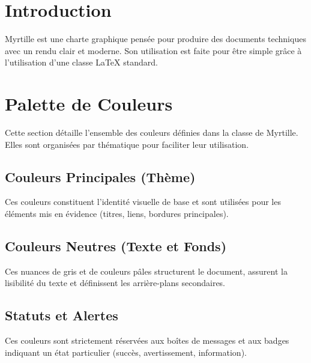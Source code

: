 \section{Introduction}
Myrtille est une charte graphique pensée pour produire des documents techniques avec un rendu clair et moderne. Son utilisation est faite pour être simple grâce à l'utilisation d'une classe LaTeX standard. 

\section{Palette de Couleurs}

Cette section détaille l'ensemble des couleurs définies dans la classe de Myrtille. Elles sont organisées par thématique pour faciliter leur utilisation.

\subsection{Couleurs Principales (Thème)}
Ces couleurs constituent l'identité visuelle de base et sont utilisées pour les éléments mis en évidence (titres, liens, bordures principales).

\vspace{10pt}

\subsection{Couleurs Neutres (Texte et Fonds)}
Ces nuances de gris et de couleurs pâles structurent le document, assurent la lisibilité du texte et définissent les arrière-plans secondaires.

\vspace{10pt}

\subsection{Statuts et Alertes}
Ces couleurs sont strictement réservées aux boîtes de messages et aux badges indiquant un état particulier (succès, avertissement, information).

\vspace{10pt}

